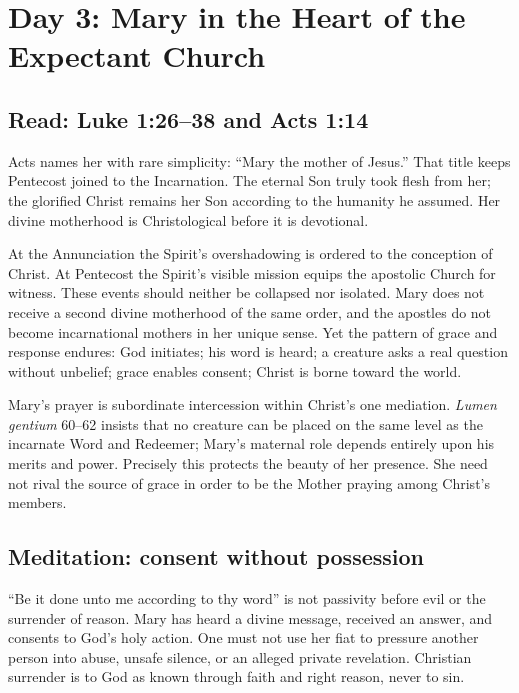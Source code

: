 \section{Day 3: Mary in the Heart of the Expectant Church}


\subsection{Read: Luke 1:26--38 and Acts 1:14}

Acts names her with rare simplicity: “Mary the mother of Jesus.” That title keeps Pentecost joined to the Incarnation. The eternal Son truly took flesh from her; the glorified Christ remains her Son according to the humanity he assumed. Her divine motherhood is Christological before it is devotional.

At the Annunciation the Spirit's overshadowing is ordered to the conception of Christ. At Pentecost the Spirit's visible mission equips the apostolic Church for witness. These events should neither be collapsed nor isolated. Mary does not receive a second divine motherhood of the same order, and the apostles do not become incarnational mothers in her unique sense. Yet the pattern of grace and response endures: God initiates; his word is heard; a creature asks a real question without unbelief; grace enables consent; Christ is borne toward the world.

Mary's prayer is subordinate intercession within Christ's one mediation. \textit{Lumen gentium} 60--62 insists that no creature can be placed on the same level as the incarnate Word and Redeemer; Mary's maternal role depends entirely upon his merits and power. Precisely this protects the beauty of her presence. She need not rival the source of grace in order to be the Mother praying among Christ's members.

\subsection{Meditation: consent without possession}

“Be it done unto me according to thy word” is not passivity before evil or the surrender of reason. Mary has heard a divine message, received an answer, and consents to God's holy action. One must not use her fiat to pressure another person into abuse, unsafe silence, or an alleged private revelation. Christian surrender is to God as known through faith and right reason, never to sin.

